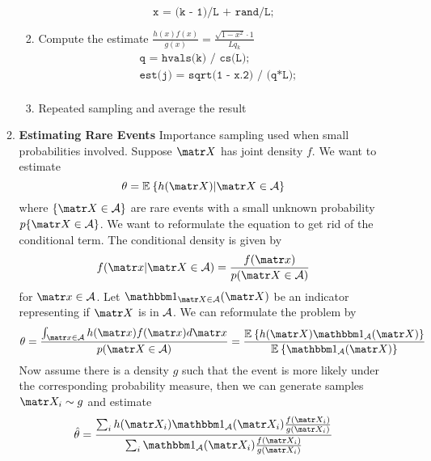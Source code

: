 \documentclass[11pt]{article}
\begin{document}
\begin{enumerate}
\begin{enumerate}
\begin{enumerate}
            \[
                \texttt{x = (k - 1)/L + rand/L;}  
            \]
            \item Compute the estimate $\textstyle\frac{h(x)f(x)}{g(x)}
            = \frac{\sqrt{1-x^2} \cdot 1}{Lq_k}$
            \begin{align*}
                &\texttt{ q = hvals(k) / cs(L);} \\ 
                &\texttt{ est(j) = sqrt(1 - x.\^{}2) / (q*L); } \\
            \end{align*}
            \item Repeated sampling and average the result
        \end{enumerate}
        \item \textbf{Estimating Rare Events} Importance sampling used when small probabilities involved. Suppose $\bX$ has joint density $f$. We want to estimate 
        \[
            \theta = \E{h(\bX) | \bX \in \calA}
        \]
        where $\{\bX \in \calA \}$ are rare events with a small unknown probability $p\{\bX \in \calA \}$. We want to reformulate the equation to get rid of the conditional term. The conditional density is given by 
        \[
            f(\bx | \bX \in \calA ) = \frac{f(\bx)}{p(\bX \in \calA)}
        \]  
        for $\bx \in \calA$. Let $\indicator{\bX \in \calA}(\bX)$ be an indicator representing if $\bX$ is in $\mathcal{A}$. We can reformulate the problem by 
        \[
            \theta 
            = \frac{\int_{\bx \in \calA} h(\bx) f(\bx) d\bx}{p(\bX \in \calA)}
            = \frac{\E{h(\bX) \indicator{\calA}(\bX)}}{\E{\indicator{\calA}(\bX)}}
        \]
        Now assume there is a density $g$ such that the event is more likely under the corresponding probability measure, then we can generate samples $\bX_i \sim g$ and estimate 
        \[
            \hat{\theta} = 
            \frac{
                \sum_i h(\bX_i) \indicator{\calA}(\bX_i) \frac{f(\bX_i)}{g(\bX_i)}
            }{
                \sum_i \indicator{\calA}(\bX_i) \frac{f(\bX_i)}{g(\bX_i)}
            }
        \]
    \end{enumerate}
\end{enumerate}


 
\end{document}
